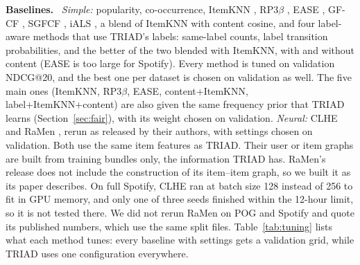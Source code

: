 \documentclass[runningheads]{llncs}
\renewcommand{\paragraph}[1]{\smallskip\noindent\textbf{#1}\ }
\begin{document}
\paragraph{Baselines.} \emph{Simple:} popularity, co-occurrence, ItemKNN \cite{sarwar2001}, RP3$\beta$
\cite{rp3beta}, EASE \cite{steck2019}, GF-CF \cite{gfcf}, SGFCF \cite{sgfcf}, iALS \cite{hu2008}, a blend of ItemKNN
with content cosine, and four label-aware methods that use TRIAD's labels: same-label counts, label transition
probabilities, and the better of the two blended with ItemKNN, with and without content (EASE is too large for
Spotify). Every method is tuned on validation NDCG@20, and the best one per dataset is chosen on validation as well.
The five main ones (ItemKNN, RP3$\beta$, EASE, content+ItemKNN, label+ItemKNN+content) are also given the same
frequency prior that TRIAD learns (Section~\ref{sec:fair}), with its weight chosen on validation. \emph{Neural:} CLHE \cite{clhe} and RaMen \cite{ramen},
rerun as released by their authors, with settings chosen on validation. Both use the same item features as TRIAD. Their user or
item graphs are built from training bundles only, the information TRIAD has. RaMen's release does not include the construction of its
item--item graph, so we built it as its paper describes. On full Spotify, CLHE ran at batch size 128 instead of 256 to fit in GPU
memory, and only one of three seeds finished within the 12-hour limit, so it is not tested there. We did not rerun
RaMen on POG and Spotify and quote its published numbers, which use the same split files. Table~\ref{tab:tuning}
lists what each method tunes: every baseline with settings gets a validation grid, while TRIAD uses one configuration everywhere.
\end{document}
